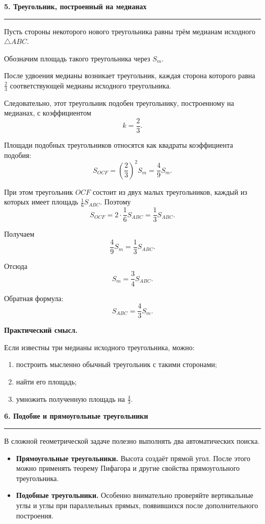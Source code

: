\documentclass[a4paper,12pt]{article}
\newcommand{\checksection}[1]{%
  \vspace{0.7em}%
  {\Large\bfseries\color{darkaccent}#1}\par
  \vspace{0.25em}
  {\color{rulegray}\rule{\linewidth}{0.6pt}}\par
  \vspace{0.5em}
}
\newcommand{\key}[1]{\textbf{\color{darkaccent}#1}}
\newcommand{\SABC}{S_{ABC}}
\begin{document}
\checksection{5. Треугольник, построенный на медианах}

Пусть стороны некоторого нового треугольника равны трём
медианам исходного $\triangle ABC$.

Обозначим площадь такого треугольника через $S_m$.

После удвоения медианы возникает треугольник, каждая сторона
которого равна $\frac23$ соответствующей медианы исходного
треугольника.

Следовательно, этот треугольник подобен треугольнику,
построенному на медианах, с коэффициентом
\[
k=\frac23.
\]

Площади подобных треугольников относятся как квадраты
коэффициента подобия:
\[
S_{OCF}
=
\left(\frac23\right)^2S_m
=
\frac49S_m.
\]

При этом треугольник $OCF$ состоит из двух малых треугольников,
каждый из которых имеет площадь $\frac16\SABC$. Поэтому
\[
S_{OCF}
=
2\cdot\frac16\SABC
=
\frac13\SABC.
\]

Получаем
\[
\frac49S_m
=
\frac13\SABC.
\]

Отсюда
\[
\boxed{S_m=\frac34\SABC}.
\]

Обратная формула:
\[
\boxed{\SABC=\frac43S_m}.
\]

\textbf{Практический смысл.}

Если известны три медианы исходного треугольника, можно:

\begin{enumerate}
  \item построить мысленно обычный треугольник с такими сторонами;
  \item найти его площадь;
  \item умножить полученную площадь на $\frac43$.
\end{enumerate}


\checksection{6. Подобие и прямоугольные треугольники}

В сложной геометрической задаче полезно выполнять два
автоматических поиска.

\begin{itemize}

  \item
  \key{Прямоугольные треугольники.}
  Высота создаёт прямой угол. После этого можно применять
  теорему Пифагора и другие свойства прямоугольного
  треугольника.

  \item
  \key{Подобные треугольники.}
  Особенно внимательно проверяйте вертикальные углы и углы
  при параллельных прямых, появившихся после дополнительного
  построения.

\end{itemize}
\end{document}
